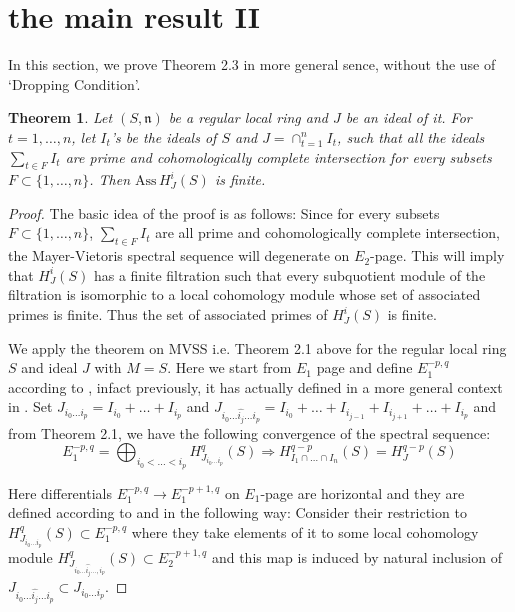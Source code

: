 \documentclass[10pt]{amsart}
\theoremstyle{plain}
\newtheorem{thm}{Theorem}[section]
\theoremstyle{definition}
\newcommand{\ideal}[1]{\mathfrak{#1}}
\newcommand{\n}{\ideal{n}}
\newcommand{\func}[1]{\mathrm{#1} \,}
\newcommand{\Ass}{\func{Ass}}
\begin{document}
\section{the main result II}

In this section, we prove Theorem 2.3 in more general sence, without the use of `Dropping Condition'. 

\begin{thm}
Let $(S,\n)$ be a %
regular local ring and $J$ be an ideal of it. For $t=1,\ldots, n$, let $I_t$'s be the ideals  of $S$ and $J=\cap^n_{t=1} I_t$, such that all the ideals $\sum_{t\in F}I_t$ are prime and cohomologically complete intersection for every subsets $F\subset\{1,\dots,n\}$. Then $\Ass H^i_{J} (S)$ is finite.
\end{thm}


\begin{proof}

The basic idea of the proof is as follows: Since for every subsets $F\subset\{1,\dots,n\}$, $\sum_{t\in F}I_t$ are all prime and cohomologically complete intersection, the Mayer-Vietoris spectral sequence will degenerate on $E_2$-page. This will imply that $H^i_{J} (S)$ has a finite filtration such that every subquotient module of the filtration is isomorphic to a local cohomology module whose set of associated primes is finite. Thus the set of associated primes of $H^i_{J} (S)$ is finite. 

We apply the theorem on MVSS i.e. Theorem 2.1 above for the regular local ring $S$ and ideal $J$ with $M=S$. Here we start from $E_1$ page and define $E_1^{-p,q}$ according to \cite{Ly4}, infact previously, it has actually defined in a more general context in \cite{AGZ}. Set $J_{i_0\ldots i_p}=I_{i_0}+\dots+I_{i_p}$ and $J_{i_0\ldots\widehat{i_j}\ldots i_p}=I_{i_0}+\dots+I_{i_{j-1}}+I_{i_{j+1}}+\dots+I_{i_p}$ and from Theorem 2.1, we have the following convergence of the spectral sequence:
$$E_1^{-p,q}=\bigoplus_{i_0<\dots<i_p}H^q_{J_{i_0\ldots i_p}}(S)
\Longrightarrow H^{q-p}_{I_1\cap\dots\cap I_n}(S)= H^{q-p}_{J}(S)$$

Here differentials $E_1^{-p,q}\to E_1^{-p+1,q}$ on $E_1$-page are horizontal and they are defined according to \cite{Ly4} and in the following way: Consider their restriction to $H^q_{J_{i_0\ldots i_p}}(S)\subset E_1^{-p,q}$ where they take elements of it to some local cohomology module $H^{q}_{J_{i_0\ldots\widehat{i_j}\ldots,i_p}}(S)\subset E_2^{-p+1,q}$ and this map is induced by natural inclusion of $J_{i_0\ldots\widehat{i_j}\ldots i_p}\subset J_{i_0\ldots i_p}$. 


\end{proof}
\end{document}
